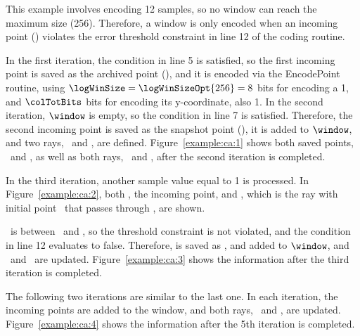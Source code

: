 This example involves encoding 12 samples, so no window can reach the maximum size (256). Therefore, a window is only encoded when an incoming point (\incoming) violates the error threshold constraint in line 12 of the coding routine.


\clearpage


In the first iteration, the condition in line 5 is satisfied, so the first incoming point is saved as the archived point (\archived), and it is encoded via the EncodePoint routine, using $\logWinSize = \logWinSizeOpt{256}=8$ bits for encoding a 1, and $\colTotBits$ bits for encoding its y-coordinate, also 1. In the second iteration, $\window$ is empty, so the condition in line 7 is satisfied. Therefore, the second incoming point is saved as the snapshot point (\snapshot), it is added to $\window$, and two rays, \smin\ and \smax, are defined. Figure~\ref{example:ca:1} shows both saved points, \archived\ and \snapshot, as well as both rays, \smin\ and \smax, after the second iteration is completed.




In the third iteration, another sample value equal to 1 is processed. In Figure~\ref{example:ca:2}, both , the incoming point, and , which is the ray with initial point \archived\ that passes through , are shown. 




\clearpage


\ is between \smin\ and \smax, so the threshold constraint is not violated, and the condition in line 12 evaluates to false. Therefore,  is saved as \snapshot, and added to $\window$, and \smin\ and \smax\ are updated. Figure~\ref{example:ca:3} shows the information after the third iteration is completed.



The following two iterations are similar to the last one. In each iteration, the incoming points are added to the window, and both rays, \smin\ and \smax, are updated. Figure~\ref{example:ca:4} shows the information after the 5th iteration is completed.



\clearpage


